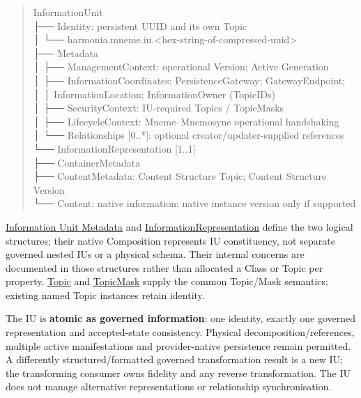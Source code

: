 \begin{quote}\small\ttfamily
InformationUnit\\
├── Identity: persistent UUID and its own Topic\\
│   └── harmonia.mneme.iu.<hex-string-of-compressed-uuid>\\
├── Metadata\\
│   ├── ManagementContext: operational Version; Active Generation\\
│   ├── InformationCoordinates: PersistenceGateway; GatewayEndpoint;\\
│   │                         InformationLocation; InformationOwner (TopicIDs)\\
│   ├── SecurityContext: IU-required Topics / TopicMasks\\
│   ├── LifecycleContext: Mneme–Mnemosyne operational handshaking\\
│   └── Relationships [0..*]: optional creator/updater-supplied references\\
└── InformationRepresentation [1..1]\\
    ├── ContainerMetadata\\
    ├── ContentMetadata: Content Structure Topic; Content Structure Version\\
    └── Content: native information; native instance version only if supported\\

\end{quote}


\hyperref[element:c05b7e37278141488ecc90b9a9ef96eb]{Information Unit Metadata} and \hyperref[element:b9891b88150840ada3daefdec6f26c35]{InformationRepresentation}
define the two logical structures; their native Composition represents IU
constituency, not separate governed nested IUs or a physical schema. Their internal
concerns are documented in those structures rather than allocated a Class or Topic
per property. \hyperref[element:9e2ffa9b4a1d4422a33c2a4bbcfc86ef]{Topic} and \hyperref[element:bb489157a6bf48be926c5a601bb0a6c3]{TopicMask} supply
the common Topic/Mask semantics; existing named Topic instances retain identity.



The IU is \textbf{atomic as governed information}: one identity, exactly one governed
representation and accepted-state consistency. Physical decomposition/references,
multiple active manifestations and provider-native persistence remain permitted.
A differently structured/formatted governed transformation result is a new IU;
the transforming consumer owns fidelity and any reverse transformation. The IU
does not manage alternative representations or relationship synchronisation.



